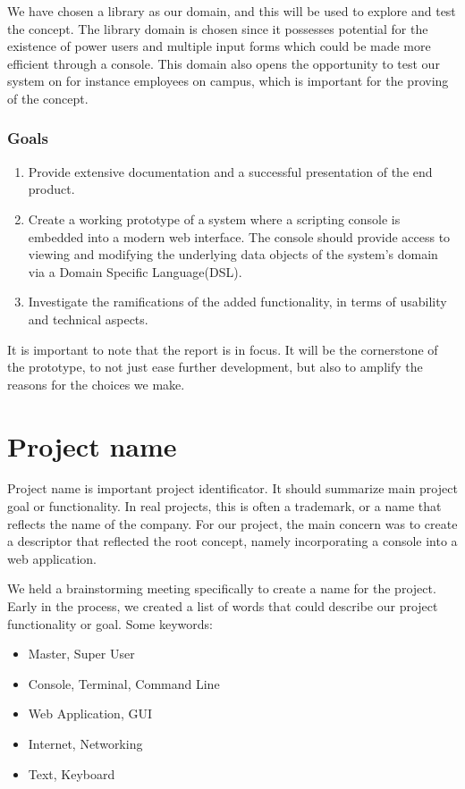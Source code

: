 We have chosen a library as our domain, and this will be used to explore and test the concept. The library domain is chosen since it possesses potential for the existence of power users and multiple input forms which could be made more efficient through a console. This domain also opens the opportunity to test our system on for instance employees on campus, which is important for the proving of the concept.
\subsubsection{Goals}
\begin{enumerate}
  \item Provide extensive documentation and a successful presentation of the end product.
  \item Create a working prototype of a system where a scripting console is embedded into a modern web interface. The console should provide access to viewing and modifying the underlying data objects of the system's domain via a Domain Specific Language(DSL).
  \item Investigate the ramifications of the added functionality, in terms of usability and technical aspects.
\end{enumerate}

It is important to note that the report is in focus. It will be the cornerstone of the prototype, to not just ease further development, but also to amplify the reasons for the choices we make.



\section{Project name}
Project name is important project identificator. It should summarize main project goal or functionality. In real projects, this is often a trademark, or a name that reflects the name of the company. For our project, the main concern was to create a descriptor that reflected the root concept, namely incorporating a console into a web application.

We held a brainstorming meeting specifically to create a name for the project. Early in the process, we created a list of words that could describe our project functionality or goal. Some keywords:
\begin{itemize}
\item Master, Super User
\item Console, Terminal, Command Line
\item Web Application, GUI
\item Internet, Networking
\item Text, Keyboard
\end{itemize}

